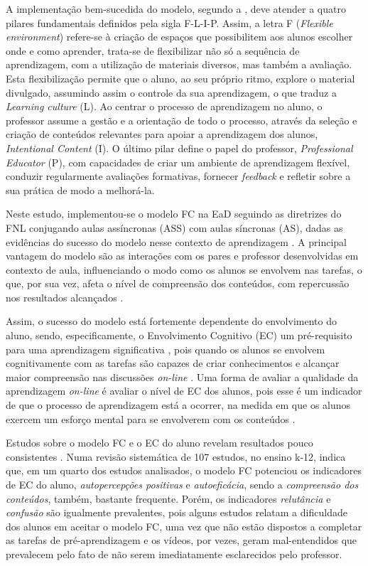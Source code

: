 \documentclass[portuguese]{textolivre}
\begin{document}
A implementação bem-sucedida do modelo, segundo a \textcite{flipped_learning_network_fln_four_2014}, deve atender a quatro pilares fundamentais definidos pela sigla F-L-I-P. Assim, a letra F (\textit{Flexible environment}) refere-se à criação de espaços que possibilitem aos alunos escolher onde e como aprender, trata-se de flexibilizar não só a sequência de aprendizagem, com a utilização de materiais diversos, mas também a avaliação. Esta flexibilização permite que o aluno, ao seu próprio ritmo, explore o material divulgado, assumindo assim o controle da sua aprendizagem, o que traduz a \textit{Learning culture} (L). Ao centrar o processo de aprendizagem no aluno, o professor assume a gestão e a orientação de todo o processo, através da seleção e criação de conteúdos relevantes para apoiar a aprendizagem dos alunos, \textit{Intentional Content} (I). O último pilar define o papel do professor, \textit{Professional Educator} (P), com capacidades de criar um ambiente de aprendizagem flexível, conduzir regularmente avaliações formativas, fornecer \textit{feedback} e refletir sobre a sua prática de modo a melhorá-la.

Neste estudo, implementou-se o modelo FC na EaD seguindo as diretrizes do FNL conjugando aulas assíncronas (ASS) com aulas síncronas (AS), dadas as evidências do sucesso do modelo nesse contexto de aprendizagem \cite{ribeirinha_flipped_2021}. A principal vantagem do modelo são as interações com os pares e professor desenvolvidas em contexto de aula, influenciando o modo como os alunos se envolvem nas tarefas, o que, por sua vez, afeta o nível de compreensão dos conteúdos, com repercussão nos resultados alcançados \cite{van_alten_effects_2019}. 

Assim, o sucesso do modelo está fortemente dependente do envolvimento do aluno, sendo, especificamente, o Envolvimento Cognitivo (EC) um pré-requisito para uma aprendizagem significativa \cite{solis_teaching_2008}, pois quando os alunos se envolvem cognitivamente com as tarefas são capazes de criar conhecimentos e alcançar maior compreensão nas discussões \textit{on-line} \cite{zhu_interaction_2006}. Uma forma de avaliar a qualidade da aprendizagem \textit{on-line} é avaliar o nível de EC dos alunos, pois esse é um indicador de que o processo de aprendizagem está a ocorrer, na medida em que os alunos exercem um esforço mental para se envolverem com os conteúdos \cite{shukor_predictive_2014}. 

Estudos sobre o modelo FC e o EC do aluno revelam resultados pouco consistentes \cite{bond_facilitating_2020}. Numa revisão sistemática de 107 estudos, no ensino k-12, \textcite{bond_facilitating_2020} indica que, em um quarto dos estudos analisados, o modelo FC potenciou os indicadores de EC do aluno, \textit{autopercepções positivas} e \textit{autoeficácia}, sendo a \textit{compreensão dos conteúdos}, também, bastante frequente. Porém, os indicadores \textit{relutância} e \textit{confusão} são igualmente prevalentes, pois alguns estudos relatam a dificuldade dos alunos em aceitar o modelo FC, uma vez que não estão dispostos a completar as tarefas de pré-aprendizagem e os vídeos, por vezes, geram mal-entendidos que prevalecem pelo fato de não serem imediatamente esclarecidos pelo professor. 
\end{document}
